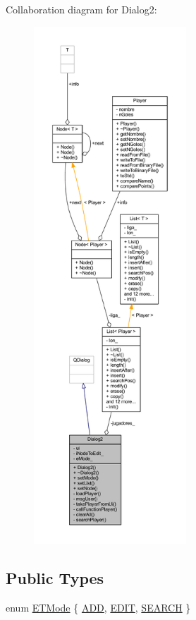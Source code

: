 Collaboration diagram for Dialog2\+:
\nopagebreak
\begin{figure}[H]
\begin{center}
\leavevmode
\includegraphics[height=550pt]{de/d78/class_dialog2__coll__graph}
\end{center}
\end{figure}
\subsection*{Public Types}
\begin{DoxyCompactItemize}
\item 
enum \hyperlink{class_dialog2_a8516d2f5d38e3777d9c6a99c3374159a}{E\+T\+Mode} \{ \hyperlink{class_dialog2_a8516d2f5d38e3777d9c6a99c3374159aa99ab8d0aab66b8d569f342432fb3054a}{A\+D\+D}, 
\hyperlink{class_dialog2_a8516d2f5d38e3777d9c6a99c3374159aa6e55cf4ea362da46b174e49f977628d4}{E\+D\+I\+T}, 
\hyperlink{class_dialog2_a8516d2f5d38e3777d9c6a99c3374159aa9e715c7822a53c88692a844d07be7891}{S\+E\+A\+R\+C\+H}
 \}
\end{DoxyCompactItemize}
